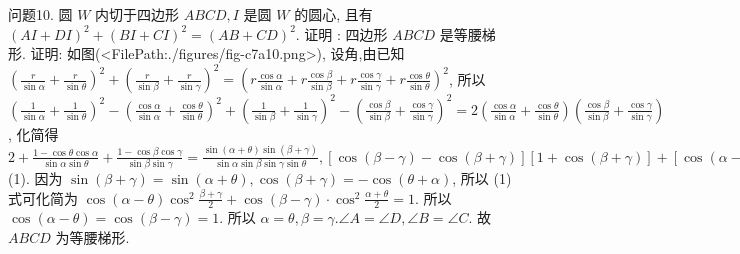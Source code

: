 问题10. 圆 $W$ 内切于四边形 $A B C D, I$ 是圆 $W$ 的圆心, 且有 $(A I+D I)^2+(B I+ C I)^2=(A B+C D)^2$. 证明 : 四边形 $A B C D$ 是等腰梯形.
证明: 如图(<FilePath:./figures/fig-c7a10.png>), 设角,由已知 $\left(\frac{r}{\sin \alpha}+\frac{r}{\sin \theta}\right)^2+ \left(\frac{r}{\sin \beta}+\frac{r}{\sin \gamma}\right)^2=\left(r \frac{\cos \alpha}{\sin \alpha}+r \frac{\cos \beta}{\sin \beta}+r \frac{\cos \gamma}{\sin \gamma}+\right. \left.r \frac{\cos \theta}{\sin \theta}\right)^2$, 所以 $\left(\frac{1}{\sin \alpha}+\frac{1}{\sin \theta}\right)^2-\left(\frac{\cos \alpha}{\sin \alpha}+\frac{\cos \theta}{\sin \theta}\right)^2+ \left(\frac{1}{\sin \beta}+\frac{1}{\sin \gamma}\right)^2-\left(\frac{\cos \beta}{\sin \beta}+\frac{\cos \gamma}{\sin \gamma}\right)^2=2\left(\frac{\cos \alpha}{\sin \alpha}+\right. \left.\frac{\cos \theta}{\sin \theta}\right)\left(\frac{\cos \beta}{\sin \beta}+\frac{\cos \gamma}{\sin \gamma}\right)$, 化简得 $2+\frac{1-\cos \theta \cos \alpha}{\sin \alpha \sin \theta}+\frac{1-\cos \beta \cos \gamma}{\sin \beta \sin \gamma}=\frac{\sin (\alpha+\theta) \sin (\beta+\gamma)}{\sin \alpha \sin \beta \sin \gamma \sin \theta},[\cos (\beta-\gamma)-\cos (\beta+\gamma)][1+\cos (\beta+ \gamma)]+[\cos (\alpha-\theta)-\cos (\alpha+\theta)] \cdot[1+\cos (\alpha+\theta)]=2 \sin (\alpha+\theta) \sin (\beta+ \gamma) \cdots$ (1). 因为 $\sin (\beta+\gamma)=\sin (\alpha+\theta), \cos (\beta+\gamma)=-\cos (\theta+\alpha)$, 所以 (1) 式可化简为 $\cos (\alpha-\theta) \cos ^2 \frac{\beta+\gamma}{2}+\cos (\beta-\gamma) \cdot \cos ^2 \frac{\alpha+\theta}{2}=1$. 所以 $\cos (\alpha- \theta)=\cos (\beta-\gamma)=1$. 所以 $\alpha=\theta, \beta=\gamma . \angle A=\angle D, \angle B=\angle C$.
故 $A B C D$ 为等腰梯形.



